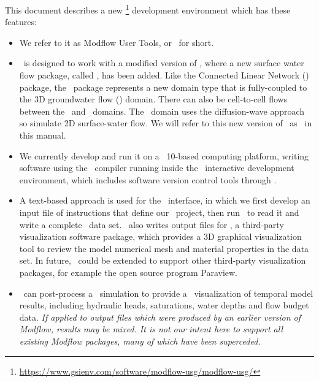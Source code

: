 \label{chapter:Introduction} This document describes a new \mfu\footnote{\url{https://www.gsienv.com/software/modflow-usg/modflow-usg/}}  development environment which has these features:
\begin{itemize}
    \item We refer to it as Modflow User Tools, or \mut\ for short.
    \item \mut\ is designed to work with a modified version of \mfu,  where a new surface water flow package, called \swf, has been added. Like the Connected Linear Network (\cln) package, the \swf\ package represents a new domain type that is fully-coupled to the 3D groundwater flow (\gwf) domain. There can also be cell-to-cell flows between the \swf\ and \cln\ domains.  The \swf\ domain uses the diffusion-wave approach so simulate 2D surface-water flow. We will refer to this new version of \mfu\ as \mfus\ in this manual.
    \item We currently develop and run it on a \windows\ 10-based computing platform, writing software using the \ifort\ compiler running inside the \vstudio\ interactive development environment, which includes software version control tools through \github.
    \item A text-based approach is used for the \mut\ interface, in which we first develop an input file of instructions that define our \mfus\ project,  then run \mut\ to read it and write a complete \mfus\ data set. \mut\ also writes output files for \tecplot, a third-party visualization software package, which provides a 3D graphical visualization tool to review the model numerical mesh and material properties in the data set. In future, \mut\ could be extended to support other third-party visualization packages, for example the open source program Paraview.
    \item \mut\ can post-process a \mfus\ simulation to provide a \tecplot\ visualization of temporal model results, including hydraulic heads, saturations, water depths and flow budget data.  \textit{If applied to output files which were produced by an earlier version of Modflow, results may be mixed.  It is not our intent here to support all existing Modflow packages, many of which have been superceded.}
\end{itemize}

